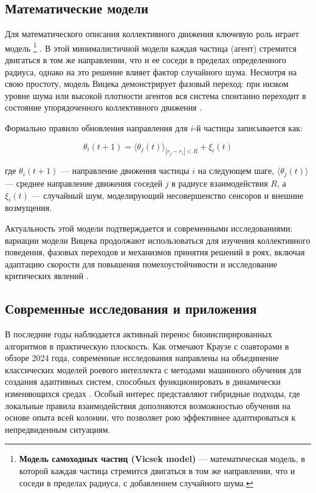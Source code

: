 \documentclass[12pt, a4paper]{article}
\newcounter{footnotecounter}
\newcommand{\termfootnote}[1]{\stepcounter{footnotecounter}\footnote{#1}}
\begin{document}
\subsection{Математические модели}

Для математического описания коллективного движения ключевую роль играет модель \termfootnote{\textbf{Модель самоходных частиц (Vicsek model)} — математическая модель, в которой каждая частица стремится двигаться в том же направлении, что и соседи в пределах радиуса, с добавлением случайного шума.} \cite{vicsek2012}. В этой минималистичной модели каждая частица (агент) стремится двигаться в том же направлении, что и ее соседи в пределах определенного радиуса, однако на это решение влияет фактор случайного шума. Несмотря на свою простоту, модель Вицека демонстрирует фазовый переход: при низком уровне шума или высокой плотности агентов вся система спонтанно переходит в состояние упорядоченного коллективного движения \cite{vicsek2012}.

Формально правило обновления направления для $i$-й частицы записывается как:

\begin{equation}
\theta_i(t+1) = \langle \theta_j(t) \rangle_{|r_j - r_i| < R} + \xi_i(t)
\label{eq:vicsek}
\end{equation}

где $\theta_i(t+1)$ — направление движения частицы $i$ на следующем шаге, $\langle \theta_j(t) \rangle$ — среднее направление движения соседей $j$ в радиусе взаимодействия $R$, а $\xi_i(t)$ — случайный шум, моделирующий несовершенство сенсоров и внешние возмущения.

Актуальность этой модели подтверждается и современными исследованиями: вариации модели Вицека продолжают использоваться для изучения коллективного поведения, фазовых переходов и механизмов принятия решений в роях, включая адаптацию скорости для повышения помехоустойчивости и исследование критических явлений \cite{vicsek2012}.

\subsection{Современные исследования и приложения}

В последние годы наблюдается активный перенос биоинспирированных алгоритмов в практическую плоскость. Как отмечают Краузе с соавторами в обзоре 2024 года, современные исследования направлены на объединение классических моделей роевого интеллекта с методами машинного обучения для создания адаптивных систем, способных функционировать в динамически изменяющихся средах \cite{krause2024}. Особый интерес представляют гибридные подходы, где локальные правила взаимодействия дополняются возможностью обучения на основе опыта всей колонии, что позволяет рою эффективнее адаптироваться к непредвиденным ситуациям.
\end{document}
